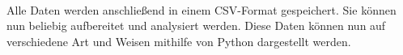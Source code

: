\\
Alle Daten werden anschließend in einem CSV-Format gespeichert.
Sie können nun beliebig aufbereitet und analysiert werden.
Diese Daten können nun auf verschiedene Art und Weisen mithilfe von Python dargestellt werden.\\
\\
